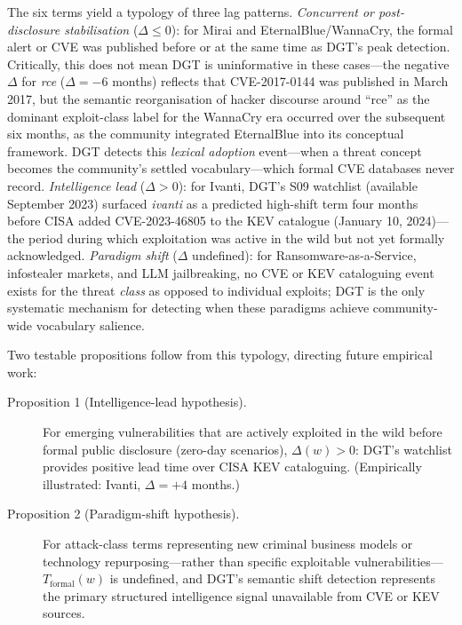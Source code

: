 \documentclass[12pt]{article}
\begin{document}
The six terms yield a typology of three lag patterns. \textit{Concurrent or post-disclosure stabilisation} ($\Delta \leq 0$): for Mirai and EternalBlue/WannaCry, the formal alert or CVE was published before or at the same time as DGT's peak detection. Critically, this does not mean DGT is uninformative in these cases---the negative $\Delta$ for \textit{rce} ($\Delta = -6$ months) reflects that CVE-2017-0144 was published in March 2017, but the semantic reorganisation of hacker discourse around ``rce'' as the dominant exploit-class label for the WannaCry era occurred over the subsequent six months, as the community integrated EternalBlue into its conceptual framework. DGT detects this \textit{lexical adoption} event---when a threat concept becomes the community's settled vocabulary---which formal CVE databases never record. \textit{Intelligence lead} ($\Delta > 0$): for Ivanti, DGT's S09 watchlist (available September 2023) surfaced \textit{ivanti} as a predicted high-shift term four months before CISA added CVE-2023-46805 to the KEV catalogue (January 10, 2024)---the period during which exploitation was active in the wild but not yet formally acknowledged. \textit{Paradigm shift} ($\Delta$ undefined): for Ransomware-as-a-Service, infostealer markets, and LLM jailbreaking, no CVE or KEV cataloguing event exists for the threat \textit{class} as opposed to individual exploits; DGT is the only systematic mechanism for detecting when these paradigms achieve community-wide vocabulary salience.

Two testable propositions follow from this typology, directing future empirical work:

\begin{description}
\item[Proposition 1 (Intelligence-lead hypothesis).] For emerging vulnerabilities that are actively exploited in the wild before formal public disclosure (zero-day scenarios), $\Delta(w) > 0$: DGT's watchlist provides positive lead time over CISA KEV cataloguing. (Empirically illustrated: Ivanti, $\Delta = +4$ months.)
\item[Proposition 2 (Paradigm-shift hypothesis).] For attack-class terms representing new criminal business models or technology repurposing---rather than specific exploitable vulnerabilities---$T_{\mathrm{formal}}(w)$ is undefined, and DGT's semantic shift detection represents the primary structured intelligence signal unavailable from CVE or KEV sources.
\end{description}
\end{document}
